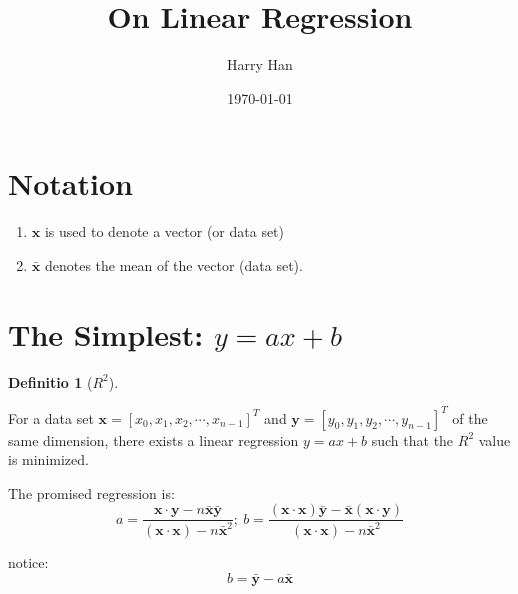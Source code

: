 \documentclass[12pt, a4paper]{article}
\title{On Linear Regression}
\author{Harry Han}
\date{\today}
\theoremstyle{definition}
\newtheorem{definition}{Definitio}[section]
\theoremstyle{remark}
\begin{document}
\maketitle

\section{Notation}
\begin{enumerate}
	\item $\bm{x}$ is used to denote a vector (or data set)
	\item $\bar{\bm{x}}$ denotes the mean of the vector (data set). 
\end{enumerate}

\section{The Simplest: $y=ax+b$}
\begin{definition}[$R^2$]
	
\end{definition}

For a data set $\bm{x}=[x_0, x_1, x_2, \cdots, x_{n-1}]^T$ and $\bm{y}=[y_0, y_1, y_2, \cdots, y_{n-1}]^T$ of the same dimension, 
there exists a linear regression $y=ax+b$ such that the $R^2$ value is minimized. 

The promised regression is:
\begin{equation}
\label{eq:SimplestRegression}
a = \frac{\bm{x}\cdot \bm{y}-n\bar{\bm{x}}\bar{\bm{y}}}{(\bm{x}\cdot \bm{x})-n\bar{\bm{x}}^2};\ 
b = \frac{(\bm{x}\cdot \bm{x})\bar{\bm{y}}-\bar{\bm{x}}(\bm{x}\cdot \bm{y})}{(\bm{x}\cdot \bm{x})-n\bar{\bm{x}}^2}
\end{equation}

notice: 
$$b=\bar{\bm{y}}-a\bar{\bm{x}}$$
\end{document}
